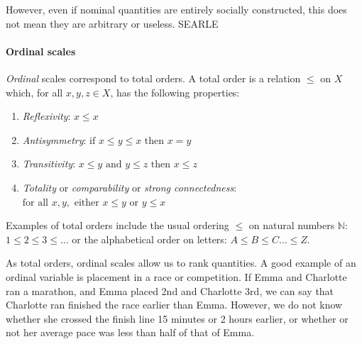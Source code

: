 \documentclass[
]{book}
\providecommand{\tightlist}{%
  \setlength{\itemsep}{0pt}\setlength{\parskip}{0pt}}
\theoremstyle{definition}
\theoremstyle{definition}
\theoremstyle{definition}
\theoremstyle{definition}
\theoremstyle{remark}
\begin{document}
However, even if nominal quantities are entirely socially constructed, this does not mean they are arbitrary or useless. SEARLE

\paragraph{Ordinal scales}\label{ordinal-scales}

\emph{Ordinal} scales correspond to total orders. A total order is a relation \(\leq\) on \(X\) which, for all \(x, y, z \in X\), has the following properties:

\begin{enumerate}
\def\labelenumi{\arabic{enumi})}
\tightlist
\item
  \emph{Reflexivity}: \(x \leq x\)
\item
  \emph{Antisymmetry}: \(\text{if } x \leq y \leq x \text{ then } x = y\)
\item
  \emph{Transitivity}: \(x \leq y \text{ and } y \leq z \text{ then } x \leq z\)
\item
  \emph{Totality} or \emph{comparability} or \emph{strong connectedness}: \(\text{for all } x, y, \text{ either } x \leq y \text{ or } y \leq x\)
\end{enumerate}

Examples of total orders include the usual ordering \(\leq\) on natural numbers \(\mathbb{N}\): \(1 \leq 2 \leq 3 \leq \ldots\) or the alphabetical order on letters: \(A \leq B \leq C \ldots \leq Z\).

As total orders, ordinal scales allow us to rank quantities. A good example of an ordinal variable is placement in a race or competition. If Emma and Charlotte ran a marathon, and Emma placed 2nd and Charlotte 3rd, we can say that Charlotte ran finished the race earlier than Emma. However, we do not know whether she crossed the finish line 15 minutes or 2 hours earlier, or whether or not her average pace was less than half of that of Emma.
\end{document}
